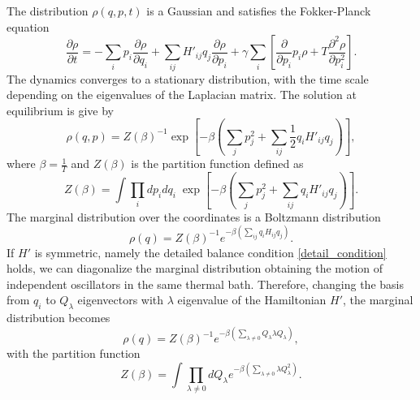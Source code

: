 The distribution $\rho(q,p,t)$ is a Gaussian and satisfies the Fokker-Planck equation \cite{Fokker}
\begin{equation}
    \frac{\partial\rho}{\partial t} = -\sum_i p_i\frac{\partial \rho}{\partial q_i} + \sum_{ij} H'_{ij}q_j\frac{\partial \rho}{\partial p_i} + \gamma\sum_{i}\left[\frac{\partial}{\partial p_i}p_i\rho + T \frac{\partial^2\rho}{\partial p_i^2}\right].
\end{equation}
The dynamics converges to a stationary distribution, with the time scale depending on the eigenvalues of the Laplacian matrix.  
The solution at equilibrium is give by
\begin{equation}
    \rho(q,p) = Z(\beta)^{-1} \exp\left[ -\beta \left( \sum_j {p_j^2} + \sum_{ij} \frac{1}{2}q_iH'_{ij}q_j\right)\right],
\end{equation}
where $\beta = \frac{1}{T}$ and $Z(\beta)$ is the partition function defined as
\begin{equation}
    Z(\beta) = \int \prod_i dp_i dq_i \; \exp\left[ -\beta \left( \sum_j {p_j^2} + \sum_{ij} q_iH'_{ij}q_j\right)\right].
\end{equation}
The marginal distribution over the coordinates is a Boltzmann distribution 
\begin{equation}
    \rho(q) = Z(\beta)^{-1} e^{-\beta \left(\sum_{ij} q_iH_{ij}q_j\right)}.
\end{equation}
If $H'$ is symmetric, namely the detailed balance condition \eqref{detail_condition} holds, we can diagonalize the marginal distribution obtaining the motion of independent oscillators in the same thermal bath.
Therefore, changing the basis from $q_i$ to $Q_\lambda$ eigenvectors with $\lambda$ eigenvalue of the Hamiltonian $H'$, the marginal distribution becomes
\begin{equation}\label{marginal_probability}
    \rho(q) = Z(\beta)^{-1} e^{-\beta \left(\sum_{\lambda \neq 0} Q_\lambda \lambda Q_\lambda\right)},
\end{equation}
with the partition function 
\begin{equation}
    Z(\beta) = \int \prod_{\lambda\neq 0} dQ_\lambda e^{-\beta \left(\sum_{\lambda \neq 0} \lambda Q_\lambda^2\right)}.
\end{equation}

